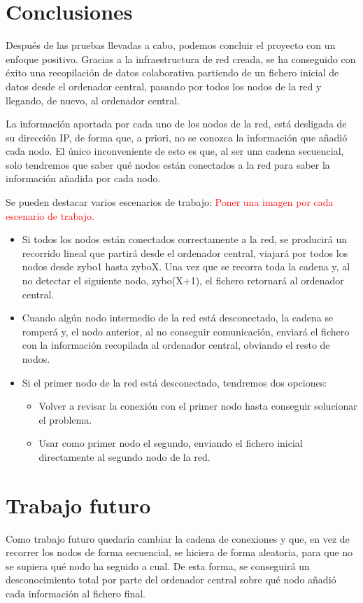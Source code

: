 \section{Conclusiones}
Después de las pruebas llevadas a cabo, podemos concluir el proyecto con un enfoque positivo. Gracias a la infraestructura de red creada, se ha conseguido con éxito una recopilación de datos colaborativa partiendo de un fichero inicial de datos desde el ordenador central, pasando por todos los nodos de la red y llegando, de nuevo, al ordenador central.

La información aportada por cada uno de los nodos de la red, está desligada de su dirección IP, de forma que, a priori, no se conozca la información que añadió cada nodo. El único inconveniente de esto es que, al ser una cadena secuencial, solo tendremos que saber qué nodos están conectados a la red para saber la información añadida por cada nodo.

Se pueden destacar varios escenarios de trabajo: \textcolor{red}{Poner una imagen por cada escenario de trabajo.}
\begin{itemize}
	\item Si todos los nodos están conectados correctamente a la red, se producirá un recorrido lineal que partirá desde el ordenador central, viajará por todos los nodos desde zybo1 hasta zyboX. Una vez que se recorra toda la cadena y, al no detectar el siguiente nodo, zybo(X+1), el fichero retornará al ordenador central.
	\item Cuando algún nodo intermedio de la red está desconectado, la cadena se romperá y, el nodo anterior, al no conseguir comunicación, enviará el fichero con la información recopilada al ordenador central, obviando el resto de nodos.
	\item Si el primer nodo de la red está desconectado, tendremos dos opciones:
	\begin{itemize}
		\item Volver a revisar la conexión con el primer nodo hasta conseguir solucionar el problema.
		\item Usar como primer nodo el segundo, enviando el fichero inicial directamente al segundo nodo de la red.
	\end{itemize}
\end{itemize}

\section{Trabajo futuro}
Como trabajo futuro quedaría cambiar la cadena de conexiones y que, en vez de recorrer los nodos de forma secuencial, se hiciera de forma aleatoria, para que no se supiera qué nodo ha seguido a cual. De esta forma, se conseguirá un desconocimiento total por parte del ordenador central sobre qué nodo añadió cada información al fichero final.

